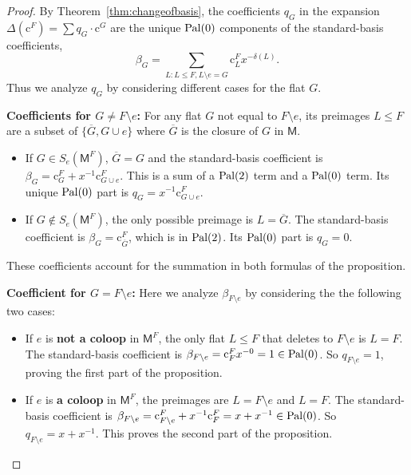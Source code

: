 \documentclass[12pt,letterpaper,english]{amsart}
\theoremstyle{teoremas}
\theoremstyle{definition}
\newcommand{\M}{\mathsf{M}}
\newcommand{\Cbasis}[1]{\mathrm{c}^{#1}}
\newcommand{\CbasisSub}[2]{\mathrm{c}^{#1}_{#2}}
\newcommand{\pal}{\normalfont\text{Pal}}
\begin{document}
\begin{proof}
    By Theorem~\ref{thm:changeofbasis}, the coefficients
    \(q_G\) in the expansion \(\Delta(\Cbasis{F}) = \sum q_G \cdot \Cbasis{G}\) are the unique \(\pal(0)\)
    components of the standard-basis coefficients,
    \[\beta_G = \sum_{L: L \le F, L\setminus e = G} \CbasisSub{F}{L} x^{-\delta(L)}.\]
    Thus we analyze
    \(q_G\) by considering different cases for the flat \(G\).

    \textbf{Coefficients for \(G \neq F \setminus e\):}
    For any flat \(G\) not equal to \(F \setminus e\), its preimages \(L \le F\) are a subset of
    \(\{\overline{G}, G \cup e\}\) where \(\overline{G}\) is the closure of \(G\) in \(\M\).
    \begin{itemize}
        \item If \(G \in S_e(\M^F)\), \(\overline{G} = G\) and the standard-basis coefficient is \(\beta_G = \CbasisSub{F}{G} + x^{-1}\CbasisSub{F}{G\cup e}\). This is a sum of a \(\pal(2)\) term and a \(\pal(0)\) term. Its unique \(\pal(0)\) part is \(q_G = x^{-1}\CbasisSub{F}{G\cup e}\).
        \item If \(G \notin S_e(\M^F)\), the only possible preimage is
              \(L=\overline{G}\). The standard-basis coefficient is
              \(\beta_G = \CbasisSub{F}{\overline{G}}\), which is in \(\pal(2)\). Its \(\pal(0)\) part is \(q_G = 0\).
    \end{itemize}
    These coefficients account for the summation in both formulas of the proposition.

    \textbf{Coefficient for \(G = F \setminus e\):}
    Here we analyze \(\beta_{F\setminus e}\) by considering the the following two cases:
    \begin{itemize}
        \item If \(e\) is \textbf{not a coloop} in \(\M^F\), the only flat \(L \le F\) that deletes to
              \(F \setminus e\) is \(L=F\). The standard-basis coefficient is \(\beta_{F\setminus e} =
              \CbasisSub{F}{F}x^{-0} = 1 \in \pal(0)\).
              So \(q_{F\setminus e} = 1\), proving the first part of the proposition.

        \item If \(e\) is \textbf{a coloop} in \(\M^F\), the preimages are \(L=F \setminus e\) and
              \(L=F\). The standard-basis coefficient is
              \(\beta_{F\setminus e} = \CbasisSub{F}{F\setminus e} + x^{-1}\CbasisSub{F}{F} = x+x^{-1}\in \pal(0)\).
              So \(q_{F\setminus e} = x+x^{-1}\). This proves the second part of the proposition.
    \end{itemize}
\end{proof}
\end{document}
